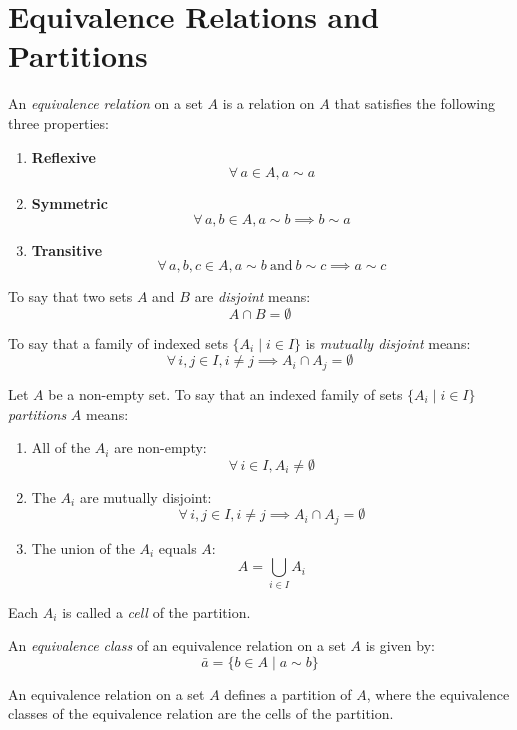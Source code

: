 \documentclass[letterpaper,12pt,fleqn]{article}
\begin{document}
\section*{Equivalence Relations and Partitions}
\begin{definition}
An \emph{equivalence relation} on a set $A$ is a relation on $A$ that satisfies
the following three properties:
\begin{enumerate}
\item \textbf{Reflexive}
\[\forall\,a\in A,a\sim a\]
\item \textbf{Symmetric}
\[\forall\,a,b\in A,a\sim b\implies b\sim a\]
\item \textbf{Transitive}
\[\forall\,a,b,c\in A,a\sim b\ \mbox{and}\ b\sim c\implies a\sim c\]
\end{enumerate}
\end{definition}
\begin{definition}
To say that two sets $A$ and $B$ are \emph{disjoint} means:
\[A\cap B=\emptyset\]

To say that a family of indexed sets $\{A_i\mid i\in I\}$ is
\emph{mutually disjoint} means:
\[\forall\,i,j\in I,i\ne j\implies A_i\cap A_j=\emptyset\]
\end{definition}
\begin{definition}
Let $A$ be a non-empty set. To say that an indexed family of sets
$\{A_i\mid i\in I\}$ \emph{partitions} $A$ means:
\begin{enumerate}
\item All of the $A_i$ are non-empty:
\[\forall\,i\in I,A_i\ne\emptyset\]
\item The $A_i$ are mutually disjoint:
\[\forall\,i,j\in I,i\ne j\implies A_i\cap A_j=\emptyset\]
\item The union of the $A_i$ equals $A$:
\[A=\bigcup_{i\in I}A_i\]
\end{enumerate}
Each $A_i$ is called a \emph{cell} of the partition.
\end{definition}
\begin{definition}
An \emph{equivalence class} of an equivalence relation on a set $A$ is given by:
\[\bar{a}=\{b\in A\mid a\sim b\}\]
\end{definition}
\begin{theorem}
An equivalence relation on a set $A$ defines a partition of $A$, where the
equivalence classes of the equivalence relation are the cells of the partition.
\end{theorem}
\end{document}
